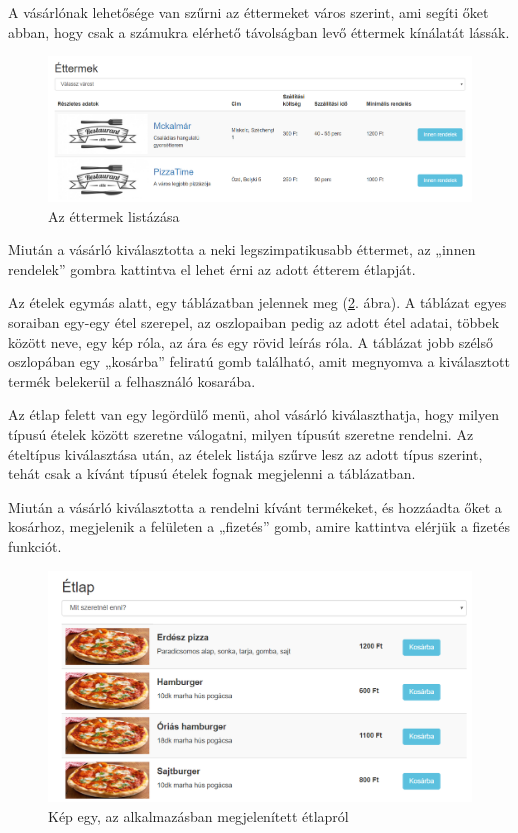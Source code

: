 A vásárlónak lehetősége van szűrni az éttermeket város szerint, ami segíti őket abban, hogy csak a számukra elérhető távolságban levő éttermek kínálatát lássák.

\begin{figure}
\centering
\includegraphics[scale=0.48]{kepek/restaurants.png}
\caption{Az éttermek listázása}
\label{fig:restaurants}
\end{figure}


Miután a vásárló kiválasztotta a neki legszimpatikusabb éttermet, az „innen rendelek” gombra kattintva el lehet érni az adott étterem étlapját.

Az ételek egymás alatt, egy táblázatban jelennek meg (\ref{fig:menu}. ábra). A táblázat egyes soraiban egy-egy étel szerepel, az oszlopaiban pedig az adott étel adatai, többek között neve, egy kép róla, az ára és egy rövid leírás róla. A táblázat jobb szélső oszlopában egy „kosárba” feliratú gomb található, amit megnyomva a kiválasztott termék belekerül a felhasználó kosarába.

Az étlap felett van egy legördülő menü, ahol vásárló kiválaszthatja, hogy milyen típusú ételek között szeretne válogatni, milyen típusút szeretne rendelni. Az ételtípus kiválasztása után, az ételek listája szűrve lesz az adott típus szerint, tehát csak a kívánt típusú ételek fognak megjelenni a táblázatban.

Miután a vásárló kiválasztotta a rendelni kívánt termékeket, és hozzáadta őket a kosárhoz, megjelenik a felületen a „fizetés” gomb, amire kattintva elérjük a fizetés funkciót.

\begin{figure}
\centering
\includegraphics[scale=0.65]{kepek/menu.png}
\caption{Kép egy, az alkalmazásban megjelenített étlapról}
\label{fig:menu}
\end{figure}

